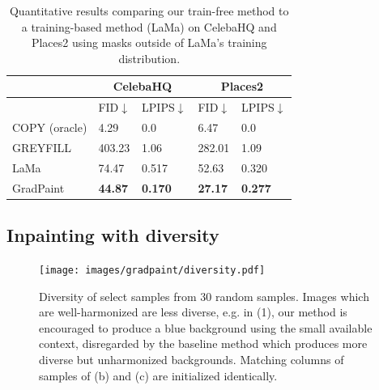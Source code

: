 \begin{table}[H]
\centering
\begin{tabular}{|l|ll|ll|}
\hline
                   & \multicolumn{2}{c|}{CelebaHQ} & \multicolumn{2}{c|}{Places2} \\ \hline
                   & \multicolumn{1}{l|}{FID$\downarrow$}             & LPIPS$\downarrow$          & \multicolumn{1}{l|}{FID$\downarrow$}            & LPIPS$\downarrow$          \\ \hline
\rowcolor[gray]{0.7}
COPY (oracle)               & \multicolumn{1}{l|}{4.29}           & 0.0          & \multicolumn{1}{l|}{6.47}          & 0.0          \\ \hline

GREYFILL               & \multicolumn{1}{l|}{403.23}           & 1.06          & \multicolumn{1}{l|}{282.01}          & 1.09          \\ \Xhline{4\arrayrulewidth}

LaMa               & \multicolumn{1}{l|}{74.47}           & 0.517          & \multicolumn{1}{l|}{52.63}          & 0.320          \\ \hline

GradPaint & \multicolumn{1}{l|}{\textbf{44.87}}  & \textbf{0.170} & \multicolumn{1}{l|}{\textbf{27.17}} & \textbf{0.277} \\ \hline

\end{tabular}
\caption{Quantitative results comparing our train-free method to a training-based method (LaMa) on CelebaHQ and Places2 using masks outside of LaMa's training distribution.}
\label{abnormal_tab}
\end{table}



\subsection{Inpainting with diversity}


\begin{figure}[htbp]
  \centering
    \texttt{[image: images/gradpaint/diversity.pdf]}
    \caption{Diversity of select samples from 30 random samples. Images which are well-harmonized are less diverse, e.g. in (1), our method is encouraged to produce a blue background using the small available context, disregarded by the baseline method which produces more diverse but unharmonized backgrounds. Matching columns of samples of (b) and (c) are initialized identically.}
    \label{fig:diversity}
\end{figure}

